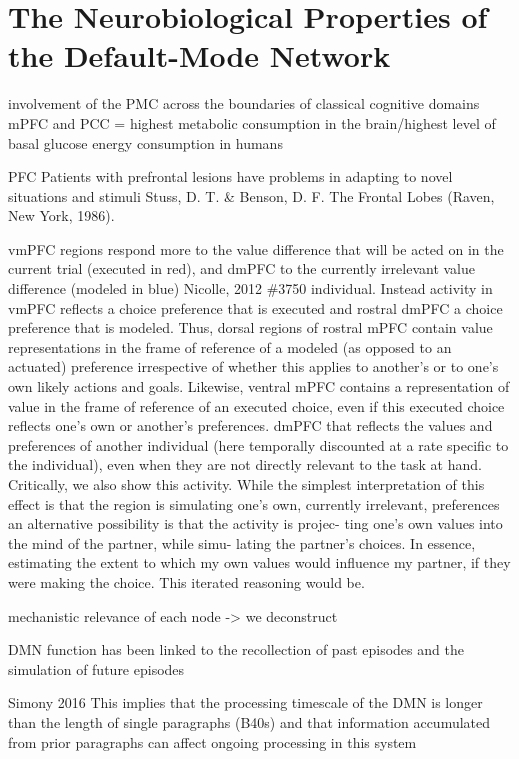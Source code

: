 \documentclass{article} %
\begin{document}
\section{The Neurobiological Properties of the Default-Mode Network}
 involvement of the PMC across the boundaries of classical cognitive domains
mPFC and PCC = highest metabolic consumption in the brain/highest level of basal glucose energy consumption in humans

PFC
Patients with prefrontal lesions have problems in adapting to novel situations and stimuli
Stuss, D. T. \& Benson, D. F. The Frontal Lobes (Raven, New York, 1986).

vmPFC regions respond more to the value difference that will be acted on in the current trial (executed in red), and dmPFC to the currently irrelevant value difference (modeled in blue) {Nicolle, 2012 \#3750} individual. Instead activity in vmPFC reflects a choice preference that is executed and rostral dmPFC a choice preference that is modeled. Thus, dorsal regions of rostral mPFC contain value representations in the frame of reference of a modeled (as opposed to an actuated) preference irrespective of whether this applies to another’s or to one’s own likely actions and goals. Likewise, ventral mPFC contains a representation of value in the frame of reference of an executed choice, even if this executed choice reflects one’s own or another’s preferences. dmPFC that reflects the values and preferences of another individual (here temporally discounted at a rate specific to the individual), even when they are not directly relevant to the task at hand. Critically, we also show this activity. While the simplest interpretation of this effect is that the region is simulating one’s own, currently irrelevant, preferences an alternative possibility is that the activity is projec- ting one’s own values into the mind of the partner, while simu- lating the partner’s choices. In essence, estimating the extent to which my own values would influence my partner, if they were making the choice. This iterated reasoning would be.

mechanistic relevance of each node -> we deconstruct

DMN function has been linked to the recollection of past episodes and the simulation of future episodes

Simony 2016
This implies that the processing timescale of the DMN is longer than the length of single paragraphs (B40s) and that information accumulated from prior paragraphs can affect ongoing processing in this system
\end{document}
